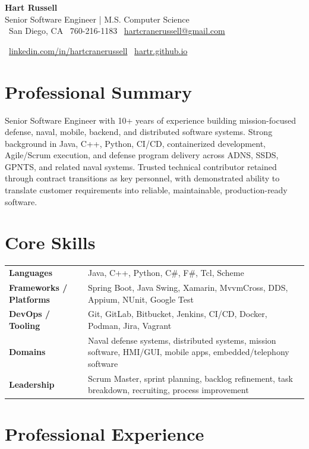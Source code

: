 \documentclass[10pt,letterpaper]{article}
\newcommand{\resumeHeader}[5]{
  {\Huge \textbf{#1}} \\[3pt]
  {\large \color{accent} #2} \\[7pt]
  \small
  \faMapMarker* \ #3 \quad
  \faPhone \ #4 \quad
  \faEnvelope \ \href{mailto:#5}{#5}
}
\newcommand{\resumeLinks}[2]{
  \small
  \faLinkedin \ \href{#1}{linkedin.com/in/hartcranerussell}
  \quad
  \faGlobe \ \href{#2}{hartr.github.io}
}
\begin{document}
\color{textgray}

\resumeHeader
  {Hart Russell}
  {Senior Software Engineer \;|\; M.S. Computer Science}
  {San Diego, CA}
  {760-216-1183}
  {hartcranerussell@gmail.com}

\vspace{3pt}
\resumeLinks
  {https://www.linkedin.com/in/hartcranerussell}
  {https://hartr.github.io/}

\vspace{7pt}

\section*{Professional Summary}
Senior Software Engineer with 10+ years of experience building mission-focused defense, naval, mobile, backend, and distributed software systems. Strong background in Java, C++, Python, CI/CD, containerized development, Agile/Scrum execution, and defense program delivery across ADNS, SSDS, GPNTS, and related naval systems. Trusted technical contributor retained through contract transitions as key personnel, with demonstrated ability to translate customer requirements into reliable, maintainable, production-ready software.

\section*{Core Skills}
\begin{tabularx}{\textwidth}{@{} l X @{}}
\textbf{Languages} & Java, C++, Python, C\#, F\#, Tcl, Scheme \\
\textbf{Frameworks / Platforms} & Spring Boot, Java Swing, Xamarin, MvvmCross, DDS, Appium, NUnit, Google Test \\
\textbf{DevOps / Tooling} & Git, GitLab, Bitbucket, Jenkins, CI/CD, Docker, Podman, Jira, Vagrant \\
\textbf{Domains} & Naval defense systems, distributed systems, mission software, HMI/GUI, mobile apps, embedded/telephony software \\
\textbf{Leadership} & Scrum Master, sprint planning, backlog refinement, task breakdown, recruiting, process improvement \\
\end{tabularx}

\section*{Professional Experience}
\end{document}
